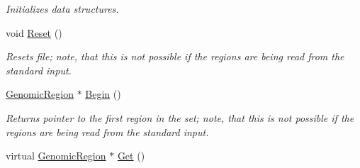 \begin{DoxyCompactItemize}
\begin{DoxyCompactList}\small\item\em Initializes data structures. \end{DoxyCompactList}\item 
\hypertarget{classGenomicRegionSet_aae7295913424148013df6a154c5458aa}{
void \hyperlink{classGenomicRegionSet_aae7295913424148013df6a154c5458aa}{Reset} ()}
\label{classGenomicRegionSet_aae7295913424148013df6a154c5458aa}

\begin{DoxyCompactList}\small\item\em Resets file; note, that this is not possible if the regions are being read from the standard input. \end{DoxyCompactList}\item 
\hypertarget{classGenomicRegionSet_a06e2e8f91623c01e6e00500888b9ba3d}{
\hyperlink{classGenomicRegion}{GenomicRegion} $\ast$ \hyperlink{classGenomicRegionSet_a06e2e8f91623c01e6e00500888b9ba3d}{Begin} ()}
\label{classGenomicRegionSet_a06e2e8f91623c01e6e00500888b9ba3d}

\begin{DoxyCompactList}\small\item\em Returns pointer to the first region in the set; note, that this is not possible if the regions are being read from the standard input. \end{DoxyCompactList}\item 
\hypertarget{classGenomicRegionSet_a77031066d2648c8935c291ef227b37be}{
virtual \hyperlink{classGenomicRegion}{GenomicRegion} $\ast$ \hyperlink{classGenomicRegionSet_a77031066d2648c8935c291ef227b37be}{Get} ()}
\label{classGenomicRegionSet_a77031066d2648c8935c291ef227b37be}


\end{DoxyCompactItemize}
